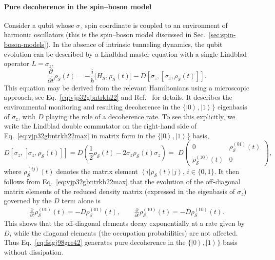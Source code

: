 \documentclass[3p,sort&compress]{elsarticle}
\newcommand{\bra}[1]{\left\langle{#1}\right\vert}
\newcommand{\ket}[1]{\left\vert{#1}\right\rangle}
\newcommand{\I}{\ensuremath{i}}
\newcommand{\op}[1]{#1}
\begin{document}
\paragraph{Pure decoherence in the spin--boson model} Consider a qubit whose $\op{\sigma}_z$ spin coordinate is coupled to an environment of harmonic oscillators (this is the spin--boson model discussed in Sec.~\ref{sec:spin-boson-models}). In the absence of intrinsic tunneling dynamics, the qubit evolution can be described by a Lindblad master equation with a single Lindblad operator $\op{L}=\op{\sigma}_z$, 
%
\begin{equation}
\label{eq:vjp32gbntrkh22max}
\frac{\partial}{\partial t} \op{\rho}_\mathcal{S}(t) = -\frac{\I}{\hbar} \bigl[
  \op{H}_\mathcal{S}, \op{\rho}_\mathcal{S}(t) \bigr] -
D \left[ \op{\sigma}_z, \left[ \op{\sigma}_z,
    \op{\rho}_\mathcal{S}(t) \right]\right].
\end{equation}
%
This equation may be derived from the relevant Hamiltonians using a microscopic approach; see Eq.~\eqref{eq:vjp32gbntrkh22}  and Ref.~\cite{Schlosshauer:2007:un} for details. It describes the environmental monitoring and resulting decoherence in the $\{\ket{0},\ket{1}\}$ eigenbasis of $\op{\sigma}_z$, with $D$ playing the role of a decoherence rate.  To see this explicitly, we write the Lindblad double commutator on the right-hand side of Eq.~\eqref{eq:vjp32gbntrkh22max} in matrix form in the $\{\ket{0},\ket{1}\}$ basis, 
%
\begin{equation}
  \label{eq:fsigj98gre42}
  D \left[ \op{\sigma}_z, \left[ \op{\sigma}_z,
    \op{\rho}_\mathcal{S}(t) \right]\right] = D \left(
  \frac{1}{2} \op{\rho}_\mathcal{S}(t) - 2\op{\sigma}_z
  \op{\rho}_\mathcal{S}(t) \op{\sigma}_z \right) \dot{=}
\,\,D \left( \begin{array}{cc} 0 & \rho_\mathcal{S}^{(01)}(t) \\
    \rho_\mathcal{S}^{(10)}(t) & 0\end{array} \right),
\end{equation}
%
where $\rho_\mathcal{S}^{(ij)}(t)$ denotes the matrix element $\bra{i} \op{\rho}_\mathcal{S}(t) \ket{j}$, $i \in \{0,1\}$. It then follows from Eq.~\eqref{eq:vjp32gbntrkh22max} that the evolution of the off-diagonal matrix elements of the reduced density matrix (expressed in the eigenbasis of $\op{\sigma}_z$) governed by the $D$ term alone is
%
\begin{align}
  \label{eq:44}
  \frac{\partial}{\partial t} \rho_\mathcal{S}^{(01)}(t) = -
  D\rho_\mathcal{S}^{(01)}(t), \qquad
  \frac{\partial}{\partial t} \rho_\mathcal{S}^{(10)}(t) = - D\rho_\mathcal{S}^{(10)}(t).
\end{align}
%
This shows that the off-diagonal elements decay exponentially at a rate given by $D$, while the diagonal elements (the occupation probabilities) are not affected. Thus Eq.~\eqref{eq:fsigj98gre42} generates pure decoherence in the $\{\ket{0},\ket{1}\}$ basis without dissipation.
\end{document}

